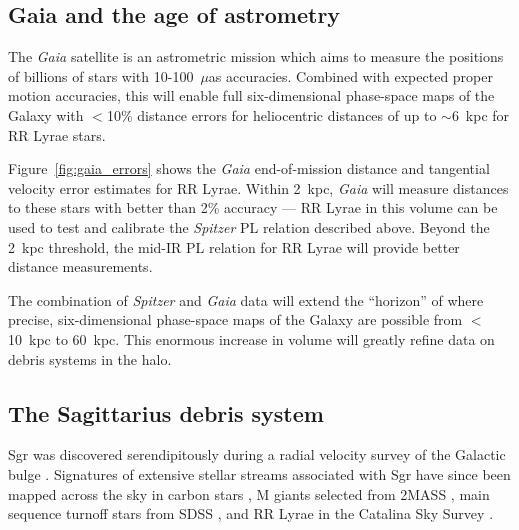 \documentclass{emulateapj}
\begin{document}
\subsection{Gaia and the age of astrometry}
\label{sec:gaia}
The {\it Gaia} satellite \citep{gaia01} is
an astrometric mission which aims to measure the positions of billions
of stars with 10-100~$\mu$as accuracies. Combined with expected 
proper motion accuracies, this will enable full six-dimensional phase-space 
maps of the Galaxy with $<$10\% distance errors for heliocentric distances of
up to $\sim$6~kpc for RR Lyrae stars.

Figure~\ref{fig:gaia_errors} shows the {\it Gaia} end-of-mission distance
and tangential velocity error estimates for RR Lyrae. Within 2~kpc, {\it Gaia} will measure distances to these stars with
better than 2\% accuracy --- RR Lyrae in this volume can be used to
test and calibrate the {\it Spitzer} PL relation described above. Beyond the
2~kpc threshold, the mid-IR PL relation for RR Lyrae will provide better 
distance measurements. 

The combination of {\it Spitzer} and {\it Gaia} data will 
extend the ``horizon'' of where precise, six-dimensional phase-space 
maps of the Galaxy are possible from $<$10~kpc to 60~kpc. This enormous 
increase in volume will greatly refine data on debris systems in the halo.

\subsection{The Sagittarius debris system}
\label{sec:sgr}
Sgr was discovered serendipitously during a radial velocity 
survey of the Galactic bulge \citep{ibata94}. 
Signatures of extensive stellar
streams associated with Sgr have since  been
mapped across the sky in carbon stars \citep{totten98}, M giants
selected from 2MASS \citep{majewski03}, main
sequence turnoff stars from SDSS
\citep{belokurov06}, and RR Lyrae in the Catalina Sky Survey
\citep{drake13}. 
\end{document}
